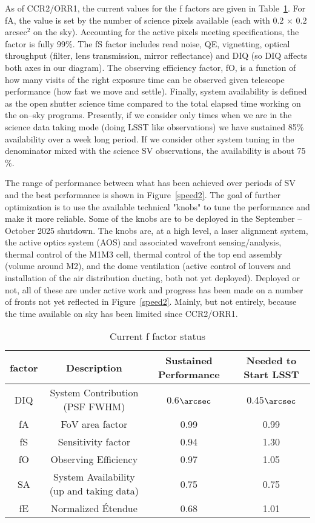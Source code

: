 As of CCR2/ORR1, the current values for the f factors are given in Table~\ref{tab:factors}. For fA, the value is set by the number of science pixels available (each with 0.2 $\times$ 0.2 arcsec$^2$ on the sky). Accounting for the active pixels meeting specifications, the factor is fully 99$\%$. The fS factor includes read noise, QE, vignetting, optical throughput (filter, lens transmission, mirror reflectance) and DIQ (so DIQ affects both axes in our diagram). The observing efficiency factor, fO, is a function of how many visits of the right exposure time can be observed given telescope performance (how fast we move and settle). Finally, system availability is defined as the open shutter science time compared to the total elapsed time working on the on--sky programs. Presently, if we consider only times when we are in the science data taking mode (doing LSST like observations) we have sustained 85$\%$ availability over a week long period. If we consider other system tuning in the denominator mixed with the science SV observations, the availability is about 75$\%$. 

The range of performance between what has been achieved over periods of SV and the best performance is shown in Figure~\ref{speed2}. The goal of further optimization is to use the available technical "knobs" to tune the performance and make it more reliable. Some of the knobs are to be deployed in the September -- October 2025 shutdown. The knobs are, at a high level, a laser alignment system, the active optics system (AOS) and associated wavefront sensing/analysis, thermal control of the M1M3 cell, thermal control of the top end assembly (volume around M2), and the dome ventilation (active control of louvers and installation of the air distribution ducting, both not yet deployed). Deployed or not, all of these are under active work and progress has been made on a number of fronts not yet reflected in Figure~\ref{speed2}. Mainly, but not entirely,  because the time available on sky has been limited since CCR2/ORR1. 

\begin{table}[]
\renewcommand{\arraystretch}{2}
\small
\centering
\caption{Current f factor status}\label{tab:factors}
\begin{tabular}{cccc}
\hline
factor & Description& Sustained Performance & Needed to Start LSST \\
\hline \hline
DIQ & System Contribution (PSF FWHM)  & 0.6$\arcsec$ & 0.45$\arcsec$ \\
fA & FoV area factor & 0.99 & 0.99 \\
fS & Sensitivity factor & 0.94 & 1.30 \\
fO & Observing Efficiency & 0.97 & 1.05 \\
SA & System Availability (up and taking data) & 0.75 & 0.75 \\
fE & Normalized \'{E}tendue & 0.68 & 1.01 \\

\hline
\end{tabular}
\end{table}

